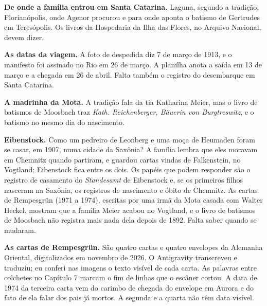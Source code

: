 \documentclass[
  brazilian,
  11pt,
  openany]{book}
\begin{document}
\textbf{De onde a família entrou em Santa Catarina.} Laguna, segundo a
tradição; Florianópolis, onde Agenor procurou e para onde aponta o
batismo de Gertrudes em Teresópolis. Os livros da Hospedaria da Ilha das
Flores, no Arquivo Nacional, devem dizer.

\textbf{As datas da viagem.} A foto de despedida diz 7 de março de 1913,
e o manifesto foi assinado no Rio em 26 de março. A planilha anota a
saída em 13 de março e a chegada em 26 de abril. Falta também o registro
do desembarque em Santa Catarina.

\textbf{A madrinha da Mota.} A tradição fala da tia Katharina Meier, mas
o livro de batismos de Moosbach traz \emph{Kath. Reichenberger, Bäuerin
von Burgtreswitz}, e o batismo no mesmo dia do nascimento.

\textbf{Eibenstock.} Como um pedreiro de Leonberg e uma moça de Heumaden
foram se casar, em 1907, numa cidade da Saxônia? A família lembra que
eles moravam em Chemnitz quando partiram, e guardou cartas vindas de
Falkenstein, no Vogtland; Eibenstock fica entre os dois. Os papéis que
podem responder são o registro de casamento do \emph{Standesamt} de
Eibenstock e, se os primeiros filhos nasceram na Saxônia, os registros
de nascimento e óbito de Chemnitz. As cartas de Rempesgrün (1971 a
1974), escritas por uma irmã da Mota casada com Walter Heckel, mostram
que a família Meier acabou no Vogtland, e o livro de batismos de
Moosbach não registra mais nada dela depois de 1892. Falta saber quando
se mudaram.

\textbf{As cartas de Rempesgrün.} São quatro cartas e quatro envelopes
da Alemanha Oriental, digitalizados em novembro de 2026. O Antigravity
transcreveu e traduziu; eu conferi nas imagens o texto visível de cada
carta. As palavras entre colchetes no Capítulo 7 marcam o fim de linhas
que o escâner cortou. A data de 1974 da terceira carta vem do carimbo de
chegada do envelope em Aurora e do fato de ela falar dos pais já mortos.
A segunda e a quarta não têm data visível.
\end{document}

